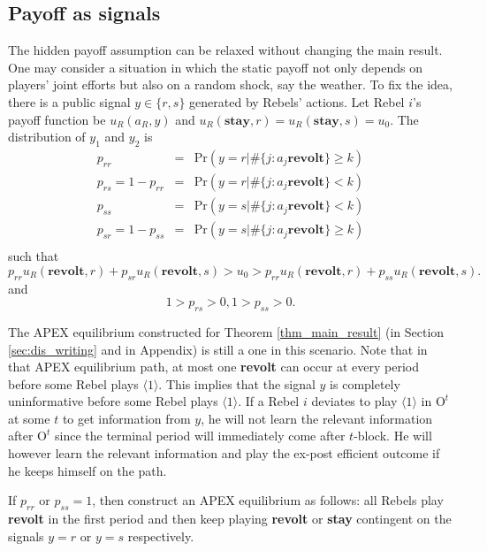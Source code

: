 \documentclass[12pt,letter]{article}
\newcommand{\Omicron}{\mathrm{O}}
\theoremstyle{definition}
\theoremstyle{remark}
\theoremstyle{claim}
\begin{document}
\subsection{Payoff as signals}
The hidden payoff assumption can be relaxed without changing the main result. One may consider a situation in which the static payoff not only depends on players' joint efforts but also on a random shock, say the weather. To fix the idea, there is a public signal $y\in \{r,s\}$ generated by Rebels' actions. Let Rebel $i$'s payoff function be $u_{R}(a_{R},y)$ and $u_{R}(\textbf{stay},r)=u_{R}(\textbf{stay},s)=u_0$. The distribution of $y_1$ and $y_2$ is 
\begin{eqnarray*}
p_{rr} &=& \mathrm {Pr}(y=r|\#\{j:a_j\textbf{revolt}\}\geq k) \\
p_{rs}=1-p_{rr} &=& \mathrm {Pr}(y=r|\#\{j:a_j\textbf{revolt}\}< k) \\
p_{ss} &=& \mathrm {Pr}(y=s|\#\{j:a_j\textbf{revolt}\}< k) \\
p_{sr}=1-p_{ss} &=& \mathrm {Pr}(y=s|\#\{j:a_j\textbf{revolt}\}\geq k) \\
\end{eqnarray*}
such that
\begin{equation*}
p_{rr}u_{R}(\textbf{revolt}, r)+p_{sr}u_{R}(\textbf{revolt}, s)>u_0>p_{rr}u_{R}(\textbf{revolt}, r)+p_{ss}u_{R}(\textbf{revolt}, s).
\end{equation*}
and
\begin{equation*}
1>p_{rs}>0,1>p_{ss}>0.
\end{equation*}

The APEX equilibrium constructed for Theorem \ref{thm_main_result} (in Section \ref{sec:dis_writing} and in Appendix) is still a one in this scenario. Note that in that APEX equilibrium path, at most one \textbf{revolt} can occur at every period before some Rebel plays $\langle 1 \rangle$. This implies that the signal $y$ is completely uninformative before some Rebel plays $\langle 1 \rangle$. If a Rebel $i$ deviates to play $\langle 1 \rangle$ in $\Omicron^t$ at some $t$ to get information from $y$, he will not learn the relevant information after $\Omicron^t$ since the terminal period will immediately come after $t$-block. He will however learn the relevant information and play the ex-post efficient outcome if he keeps himself on the path.

If $p_{rr}$ or $p_{ss}=1$, then construct an APEX equilibrium as follows: all Rebels play \textbf{revolt} in the first period and then keep playing \textbf{revolt} or \textbf{stay} contingent on the signals $y=r$ or $y=s$ respectively.
\end{document}
